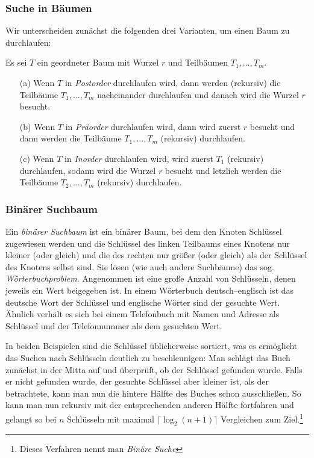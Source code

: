 \subsubsection{Suche in Bäumen}
Wir unterscheiden zunächst die folgenden drei Varianten, um einen Baum
zu durchlaufen:
\begin{defi}
  Es sei $T$ ein geordneter Baum mit Wurzel $r$ und Teilbäumen
  $T_1, \dots, T_m$.
  \begin{enumerate}
  \item[(a)] Wenn $T$ in \emph{Postorder} durchlaufen wird, dann
    werden (rekursiv) die Teilbäume $T_1, \dots, T_m$ nacheinander
    durchlaufen und danach wird die Wurzel $r$ besucht.
  \item[(b)] Wenn $T$ in \emph{Präorder} durchlaufen wird, dann wird
    zuerst $r$ besucht und dann werden die Teilbäume $T_1, \dots, T_m$
    (rekursiv) durchlaufen.
  \item[(c)] Wenn $T$ in \emph{Inorder} durchlaufen wird, wird zuerst
    $T_1$ (rekursiv) durchlaufen, sodann wird die Wurzel $r$ besucht
    und letzlich werden die Teilbäume $T_2, \dots, T_m$ (rekursiv)
    durchlaufen.
  \end{enumerate}
\end{defi}

\subsubsection{Binärer Suchbaum}
Ein \emph{binärer Suchbaum} ist ein binärer Baum, bei dem den Knoten
Schlüssel zugewiesen werden und die Schlüssel des linken Teilbaums
eines Knotens nur kleiner (oder gleich) und die des rechten nur größer
(oder gleich) als der Schlüssel des Knotens selbst sind. Sie lösen
(wie auch andere Suchbäume) das
sog. \emph{Wörterbuchproblem}. Angenommen ist eine große Anzahl von
Schlüsseln, denen jeweils ein Wert beigegeben ist. In einem Wörterbuch
deutsch–englisch ist das deutsche Wort der Schlüssel und englische
Wörter sind der gesuchte Wert. Ähnlich verhält es sich bei einem
Telefonbuch mit Namen und Adresse als Schlüssel und der Telefonnummer
als dem gesuchten Wert.

In beiden Beispielen sind die Schlüssel üblicherweise sortiert, was es
ermöglicht das Suchen nach Schlüsseln deutlich zu beschleunigen: Man
schlägt das Buch zunächst in der Mitta auf und überprüft, ob der
Schlüssel gefunden wurde. Falls er nicht gefunden wurde, der gesuchte
Schlüssel aber kleiner ist, als der betrachtete, kann man nun die
hintere Hälfte des Buches schon ausschließen. So kann man nun rekursiv
mit der entsprechenden anderen Hälfte fortfahren und gelangt so bei
$n$ Schlüsseln mit maximal $\lceil \log_2(n+1) \rceil $ Vergleichen
zum Ziel.\footnote{Dieses Verfahren nennt man \emph{Binäre Suche}}

